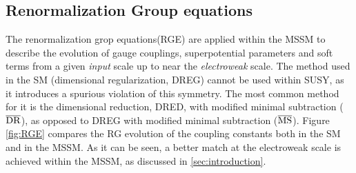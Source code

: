 \subsection{Renormalization Group equations}
\label{sec:renormalization}

The renormalization grop equations(RGE) are applied within the MSSM to describe the evolution of gauge couplings, superpotential parameters and soft terms from a given \textit{input} scale up to near the \textit{electroweak} scale. The method used in the SM (dimensional regularization, DREG) cannot be used within SUSY, as it introduces a spurious violation of this symmetry. The most common method for it is the dimensional reduction, DRED, with modified minimal subtraction ($\rm \overline{DR}$), as opposed to DREG with modified minimal subtraction ($\rm \overline{MS}$). 
Figure \ref{fig:RGE} compares the RG evolution of the coupling constants both in the SM and in the MSSM. As it can be seen, a better match at the electroweak scale is achieved within the MSSM, as discussed in \ref{sec:introduction}. 

